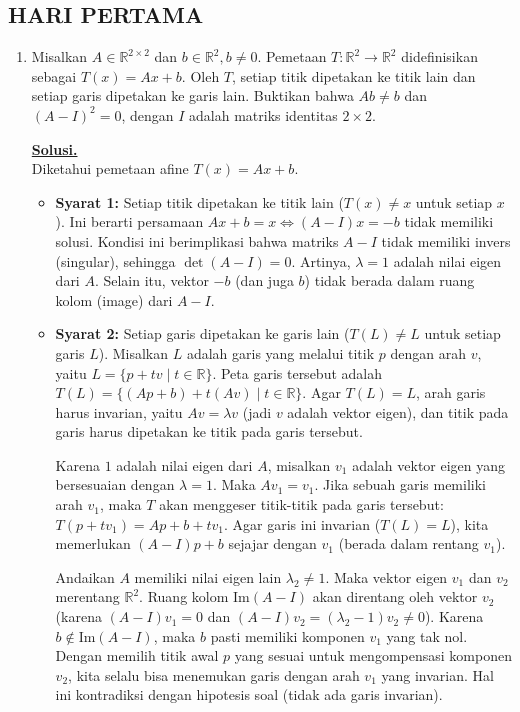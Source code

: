 \documentclass[12pt,twoside]{article}
\newenvironment{solution}
{
	\par\noindent\textbf{\underline{Solusi.}}\\
}
{
	\par
}
\begin{document}
\subsection{HARI PERTAMA}
\begin{enumerate}
  \item Misalkan $A\in\mathbb{R}^{2\times 2}$ dan $b\in \mathbb{R}^2,b\neq 0$. Pemetaan $T:\mathbb{R}^2\to\mathbb{R}^2$ didefinisikan sebagai $T(x)=Ax+b$. Oleh $T$, setiap titik dipetakan ke titik lain dan setiap garis dipetakan ke garis lain. Buktikan bahwa $Ab\neq b$ dan $(A-I)^	2=0$, dengan $I$ adalah matriks identitas $2\times2$.
        \begin{solution}
          Diketahui pemetaan afine $T(x)=Ax+b$.
          \begin{itemize}
            \item \textbf{Syarat 1:} Setiap titik dipetakan ke titik lain ($T(x)\neq x$ untuk setiap $x$).
                  Ini berarti persamaan $Ax+b=x \iff (A-I)x = -b$ tidak memiliki solusi.
                  Kondisi ini berimplikasi bahwa matriks $A-I$ tidak memiliki invers (singular), sehingga $\det(A-I)=0$. Artinya, $\lambda=1$ adalah nilai eigen dari $A$. Selain itu, vektor $-b$ (dan juga $b$) tidak berada dalam ruang kolom (image) dari $A-I$.

            \item \textbf{Syarat 2:} Setiap garis dipetakan ke garis lain ($T(L) \neq L$ untuk setiap garis $L$).
                  Misalkan $L$ adalah garis yang melalui titik $p$ dengan arah $v$, yaitu $L = \{p+tv \mid t \in \mathbb{R}\}$.
                  Peta garis tersebut adalah $T(L) = \{ (Ap+b) + t(Av) \mid t \in \mathbb{R} \}$.
                  Agar $T(L)=L$, arah garis harus invarian, yaitu $Av = \lambda v$ (jadi $v$ adalah vektor eigen), dan titik pada garis harus dipetakan ke titik pada garis tersebut.

                  Karena $1$ adalah nilai eigen dari $A$, misalkan $v_1$ adalah vektor eigen yang bersesuaian dengan $\lambda=1$. Maka $Av_1=v_1$.
                  Jika sebuah garis memiliki arah $v_1$, maka $T$ akan menggeser titik-titik pada garis tersebut: $T(p+tv_1) = Ap+b+tv_1$.
                  Agar garis ini invarian ($T(L)=L$), kita memerlukan $(A-I)p+b$ sejajar dengan $v_1$ (berada dalam rentang $v_1$).

                  Andaikan $A$ memiliki nilai eigen lain $\lambda_2 \neq 1$. Maka vektor eigen $v_1$ dan $v_2$ merentang $\mathbb{R}^2$.
                  Ruang kolom $\text{Im}(A-I)$ akan direntang oleh vektor $v_2$ (karena $(A-I)v_1=0$ dan $(A-I)v_2=(\lambda_2-1)v_2 \neq 0$).
                  Karena $b \notin \text{Im}(A-I)$, maka $b$ pasti memiliki komponen $v_1$ yang tak nol.
                  Dengan memilih titik awal $p$ yang sesuai untuk mengompensasi komponen $v_2$, kita selalu bisa menemukan garis dengan arah $v_1$ yang invarian.
                  Hal ini kontradiksi dengan hipotesis soal (tidak ada garis invarian).


\end{itemize}
\end{solution}
\end{enumerate}
\end{document}
